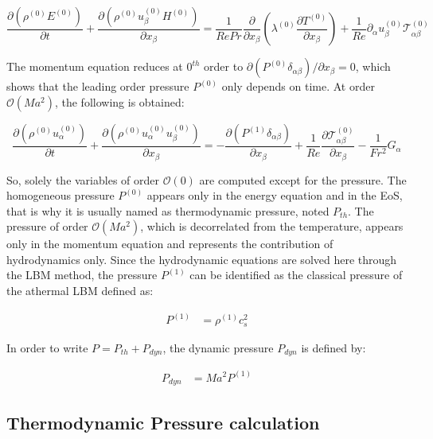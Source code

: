 \begin{equation}
    \frac{\partial (\rho^{(0)} E^{(0)})}{\partial t} + \frac{\partial (\rho^{(0)} u_\beta^{(0)} H^{(0)})}{\partial x_\beta} = \frac{1}{Re Pr} \frac{\partial }{\partial x_\beta} (\lambda^{(0)} \frac{\partial T^{(0)}}{\partial x_\beta}) + \frac{1}{Re} \partial_\alpha u_\beta^{(0)}\mathcal{T}_{\alpha\beta}^{(0)}
\end{equation}

The momentum equation reduces at $0^{th}$ order to $\partial
(P^{(0)}\delta_{\alpha\beta}) / \partial x_\beta=0$, which shows that the
leading order pressure $P^{(0)}$ only depends on time. At order
$\mathcal{O}(M\!a^2)$, the following is obtained: 

\begin{equation}
    \frac{\partial (\rho^{(0)} u^{(0)}_\alpha)}{\partial t} + \frac{\partial (\rho^{(0)} u^{(0)}_\alpha u^{(0)}_\beta)}{\partial x_\beta} = -\frac{\partial (P^{(1)}\delta_{\alpha\beta})}{\partial x_\beta} + \frac{1}{Re} \frac{\partial \mathcal{T}_{\alpha\beta}^{(0)}}{\partial x_\beta} - \frac{1}{Fr^2}G_\alpha
\end{equation}


So, solely the variables of order $\mathcal{O}(0)$ are computed except for the
pressure. The homogeneous pressure $P^{(0)}$ appears only in the energy equation
and in the EoS, that is why it is usually named as thermodynamic pressure, noted
$P_{th}$. The pressure of order $\mathcal{O}(M\!a^2)$, which is decorrelated
from the temperature, appears only in the momentum equation and represents the
contribution of hydrodynamics only. Since the hydrodynamic equations are solved
here through the LBM method, the pressure $P^{(1)}$ can be identified as the
classical pressure of the athermal LBM defined as: 

\begin{align}
    P^{(1)} &=  \rho^{(1)} c_s^2
\end{align}

In order to write $P = P_{th} + P_{dyn}$, the dynamic pressure $P_{dyn}$ is
defined by:

\begin{align}
    P_{dyn} &= M\!a^2 P^{(1)}
\end{align}


\subsection{Thermodynamic Pressure calculation}

